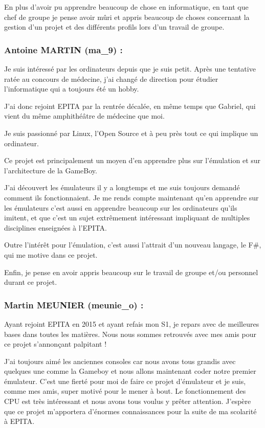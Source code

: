 \documentclass[12pt, a4paper]{article}
\begin{document}
En plus d'avoir pu apprendre beaucoup de chose en informatique, en tant que chef de groupe je pense avoir mûri et appris beaucoup de choses concernant la gestion d'un projet et des différents profils lors d'un travail de groupe.
\pagebreak


\subsubsection{Antoine MARTIN (ma\_9) :}

\bigskip
Je suis intéressé par les ordinateurs depuis que je suis petit. Après une tentative ratée au concours de médecine, j'ai changé de direction pour étudier l'informatique qui a toujours été un hobby. 

J'ai donc rejoint EPITA par la rentrée décalée, en même temps que Gabriel, qui vient du même amphithéâtre de médecine que moi.

\bigskip
Je suis passionné par Linux, l'Open Source et à peu près tout ce qui implique un ordinateur.

\bigskip
Ce projet est principalement un moyen d'en apprendre plus sur l'émulation et sur l'architecture de la GameBoy.

J'ai découvert les émulateurs il y a longtemps et me suis toujours demandé comment ils fonctionnaient. Je me rends compte maintenant qu'en apprendre sur les émulateurs c'est aussi en apprendre beaucoup sur les ordinateurs qu'ils imitent, et que c'est un sujet extrêmement intéressant impliquant de multiples disciplines enseignées à l'EPITA.

\bigskip
Outre l'intérêt pour l'émulation, c'est aussi l'attrait d'un nouveau langage, le F\#, qui me motive dans ce projet.

\bigskip
Enfin, je pense en avoir appris beaucoup sur le travail de groupe et/ou personnel durant ce projet.

\pagebreak
\subsubsection{Martin MEUNIER (meunie\_o) :}

\bigskip
Ayant rejoint EPITA en 2015 et ayant refais mon S1, je repars avec de meilleures bases dans toutes les matières. Nous nous sommes retrouvés avec mes amis pour ce projet s’annonçant palpitant ! 

\bigskip
J’ai toujours aimé les anciennes consoles car nous avons tous grandis avec quelques une comme la Gameboy et nous allons maintenant coder notre premier émulateur. C’est une fierté pour moi de faire ce projet d’émulateur et je suis, comme mes amis, super motivé pour le mener à bout. Le fonctionnement des CPU est très intéressant et nous avons tous voulus y prêter attention. J’espère que ce projet m’apportera d’énormes connaissances pour la suite de ma scolarité à EPITA. 
\end{document}
